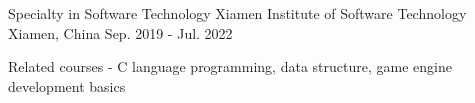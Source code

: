 

\begin{cventries}

  \cventry
    {Specialty in Software Technology} %
    {Xiamen Institute of Software Technology} %
    {Xiamen, China} %
    {Sep. 2019 - Jul. 2022} %
    {
      \begin{cvitems} %
        \item {Related courses - C language programming, data structure, game engine development basics}
      \end{cvitems}
    }

\end{cventries}
